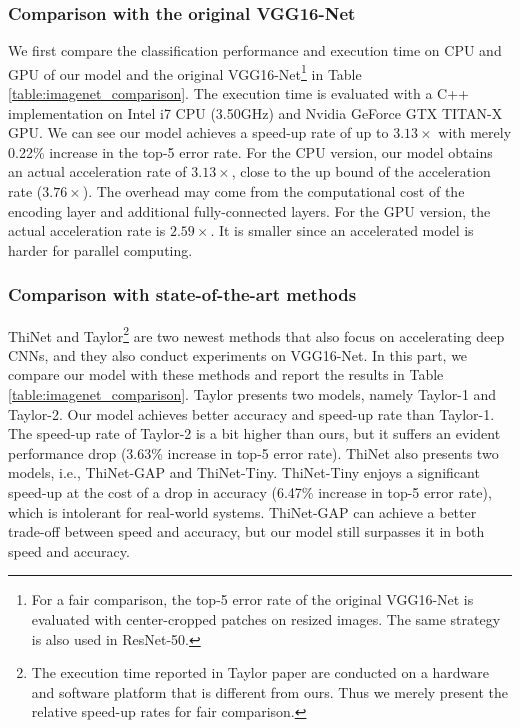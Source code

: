 \documentclass[letterpaper]{article} %
\begin{document}
\subsubsection{Comparison with the original VGG16-Net}
We first compare the classification performance and execution time on CPU and GPU of our model and the original VGG16-Net\footnote{For a fair comparison, the top-5 error rate of the original VGG16-Net is evaluated with center-cropped patches on resized images. The same strategy is also used in ResNet-50.} in Table \ref{table:imagenet_comparison}. The execution time is evaluated with a C++ implementation on Intel i7 CPU (3.50GHz) and Nvidia GeForce GTX TITAN-X GPU. We can see our model achieves a speed-up rate of up to $3.13\times$ with merely 0.22\% increase in the top-5 error rate. For the CPU version, our model obtains an actual acceleration rate of $3.13\times$, close to the up bound of the acceleration rate ($3.76\times$). The overhead may come from the computational cost of the encoding layer and additional fully-connected layers. For the GPU version, the actual acceleration rate is $2.59\times$. It is smaller since an accelerated model is harder for parallel computing.

\subsubsection{Comparison with state-of-the-art methods}
ThiNet \cite{luo2017thinet} and Taylor\footnote{The execution time reported in Taylor paper are conducted on a hardware and software platform that is different from ours. Thus we merely present the relative speed-up rates for fair comparison.} \cite{molchanov2016pruning} are two newest methods that also focus on accelerating deep CNNs, and they also conduct experiments on VGG16-Net. In this part, we compare our model with these methods and report the results in Table \ref{table:imagenet_comparison}. Taylor presents two models, namely Taylor-1 and Taylor-2. Our model achieves better accuracy and speed-up rate than Taylor-1. The speed-up rate of Taylor-2 is a bit higher than ours, but it suffers an evident performance drop (3.63\% increase in top-5 error rate). ThiNet also presents two models, i.e., ThiNet-GAP and ThiNet-Tiny. ThiNet-Tiny enjoys a significant speed-up at the cost of a drop in accuracy (6.47\% increase in top-5 error rate), which is intolerant for real-world systems. ThiNet-GAP can achieve a better trade-off between speed and accuracy, but our model still surpasses it in both speed and accuracy.
\end{document}
